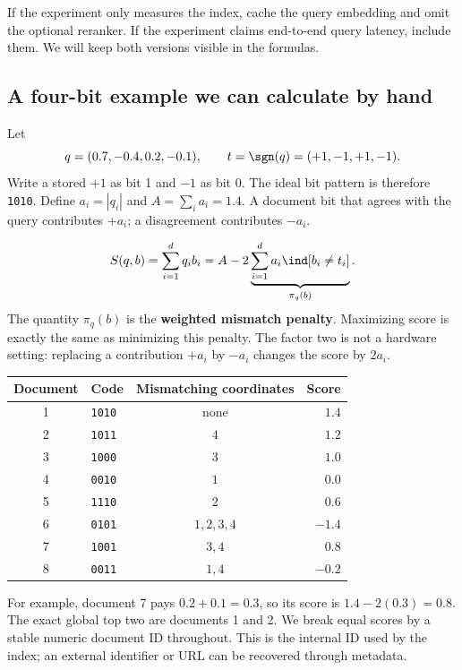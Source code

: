 If the experiment only measures the index, cache the query embedding and omit the optional
reranker. If the experiment claims end-to-end query latency, include them. We will keep both
versions visible in the formulas.

\subsection{A four-bit example we can calculate by hand}
Let
\[
q=(0.7,-0.4,0.2,-0.1),\qquad t=\sgn(q)=(+1,-1,+1,-1).
\]
Write a stored $+1$ as bit 1 and $-1$ as bit 0. The ideal bit pattern is therefore
\texttt{1010}. Define $a_i=|q_i|$ and $A=\sum_i a_i=1.4$. A document bit that agrees with the
query contributes $+a_i$; a disagreement contributes $-a_i$.

\begin{equation}
S(q,b)=\sum_{i=1}^{d}q_i b_i
       =A-2\underbrace{\sum_{i=1}^{d}a_i\ind[b_i\ne t_i]}_{\pi_q(b)}.
\label{eq:score}
\end{equation}
The quantity $\pi_q(b)$ is the \textbf{weighted mismatch penalty}. Maximizing score is exactly
the same as minimizing this penalty. The factor two is not a hardware setting: replacing a
contribution $+a_i$ by $-a_i$ changes the score by $2a_i$.

\begin{center}
\begin{tabular}{@{}clcr@{}}\toprule
Document & Code & Mismatching coordinates & Score\\\midrule
1 & \texttt{1010} & none & $1.4$\\
2 & \texttt{1011} & $4$ & $1.2$\\
3 & \texttt{1000} & $3$ & $1.0$\\
4 & \texttt{0010} & $1$ & $0.0$\\
5 & \texttt{1110} & $2$ & $0.6$\\
6 & \texttt{0101} & $1,2,3,4$ & $-1.4$\\
7 & \texttt{1001} & $3,4$ & $0.8$\\
8 & \texttt{0011} & $1,4$ & $-0.2$\\\bottomrule
\end{tabular}
\end{center}
For example, document 7 pays $0.2+0.1=0.3$, so its score is $1.4-2(0.3)=0.8$.
The exact global top two are documents 1 and 2. We break equal scores by a stable numeric document ID throughout. This is the internal ID used by the index; an external identifier or URL can be recovered through metadata.

